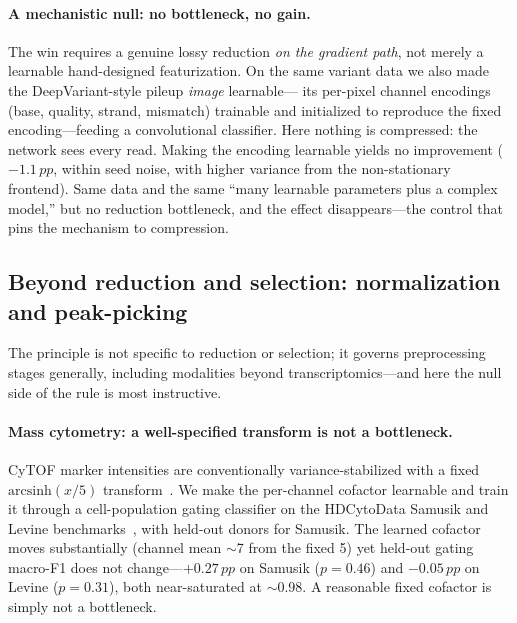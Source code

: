 \documentclass[10pt,twocolumn]{article}
\newcommand{\pp}{\,pp}
\begin{document}
\paragraph{A mechanistic null: no bottleneck, no gain.} The win requires a genuine lossy
reduction \emph{on the gradient path}, not merely a learnable hand-designed featurization.
On the same variant data we also made the DeepVariant-style pileup \emph{image} learnable---
its per-pixel channel encodings (base, quality, strand, mismatch) trainable and initialized
to reproduce the fixed encoding---feeding a convolutional classifier. Here nothing is
compressed: the network sees every read. Making the encoding learnable yields no improvement
($-1.1\pp$, within seed noise, with higher variance from the non-stationary frontend). Same
data and the same ``many learnable parameters plus a complex model,'' but no reduction
bottleneck, and the effect disappears---the control that pins the mechanism to compression.

\subsection{Beyond reduction and selection: normalization and peak-picking}
\label{sec:beyond}

The principle is not specific to reduction or selection; it governs preprocessing stages
generally, including modalities beyond transcriptomics---and here the null side of the rule is
most instructive.

\paragraph{Mass cytometry: a well-specified transform is not a bottleneck.} CyTOF marker
intensities are conventionally variance-stabilized with a fixed $\mathrm{arcsinh}(x/5)$
transform~\citep{bendall2011cytof}. We make the per-channel cofactor learnable and train it
through a cell-population gating classifier on the HDCytoData Samusik and Levine
benchmarks~\citep{weber2019hdcytodata,samusik2016,levine2015}, with held-out donors for
Samusik. The learned cofactor moves substantially (channel mean $\sim$7 from the fixed 5)
yet held-out gating macro-F1 does not change---$+0.27\pp$ on Samusik ($p{=}0.46$) and
$-0.05\pp$ on Levine ($p{=}0.31$), both near-saturated at $\sim$0.98. A reasonable fixed cofactor
is simply not a bottleneck.
\end{document}
